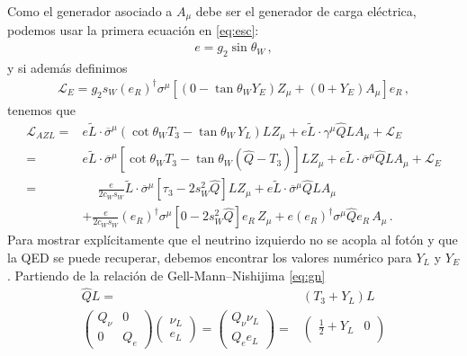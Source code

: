 \begin{frame}
Como el generador asociado a $A_\mu$ debe ser el generador de carga eléctrica, podemos usar la primera ecuación en \eqref{eq:esc}:
\begin{align}
  e=g_2\sin\theta_W\,,
\end{align}
y si además definimos
\begin{align}
  \mathcal{L}_{E}=g_2 s_W \left(e_R \right)^{\dagger}\sigma^\mu \left[ \left(0 -\tan\theta_W  Y_E  \right) Z_{\mu}  +\left( 0+ Y_E \right)  A_{\mu} \right]{e_R}\,,
\end{align}
tenemos que
\begin{align}
\label{eq:lazlf}
    \mathcal{L}_{A Z L}
=&e \widetilde{L}\cdot\overline{\sigma}^\mu\left(\cot\theta_W T_3-\tan\theta_W\,Y_L\right)L Z_\mu
       +e \widetilde{L}\cdot\gamma^\mu \widehat{Q} L A_\mu+\mathcal{L}_E\nonumber\\
=&e \widetilde{L}\cdot\overline{\sigma}^\mu\left[\cot\theta_W T_3-\tan\theta_W\left(\widehat{Q}-T_3\right)\right]L Z_\mu
       +e \widetilde{L}\cdot\overline{\sigma}^\mu \widehat{Q} L A_\mu + \mathcal{L}_E\nonumber\\
=&\phantom{+}\frac{e}{2c_W s_W} \widetilde{L}\cdot\overline{\sigma}^\mu\left[ \tau_3-2s_W^2\widehat{Q}\right]L Z_\mu
       +e \widetilde{L}\cdot\overline{\sigma}^\mu \widehat{Q} L A_\mu \nonumber\\
&+\frac{e}{2c_W s_W} \left( e_R \right)^{\dagger}{\sigma}^\mu\left[ 0-2s_W^2\widehat{Q}\right]e_R\, Z_\mu
       +e \left( e_R \right)^{\dagger}{\sigma}^\mu \widehat{Q} e_R\, A_\mu \,.
\end{align}
Para mostrar explícitamente que el neutrino izquierdo no se acopla al fotón y que la QED se puede recuperar, 
debemos encontrar los valores numérico para $Y_L$ y $Y_E$. Partiendo de la relación de Gell-Mann--Nishijima \eqref{eq:gn}
\begin{align}
  \widehat{Q}L=&(T_3+Y_L)L \nonumber\\
  \begin{pmatrix}
    Q_\nu & 0\\
    0  & Q_e
  \end{pmatrix}
  \begin{pmatrix}
    \nu_L\\
    e_L
  \end{pmatrix}=  
  \begin{pmatrix}
   Q_{\nu} \nu_L\\
   Q_e e_L
  \end{pmatrix}
= & \begin{pmatrix}
    \frac{1}{2} + Y_L & 0\\

\end{pmatrix}
\end{align}
\end{frame}
